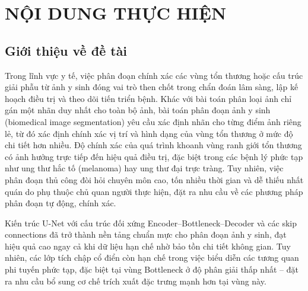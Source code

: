 \documentclass[14pt]{article}  %
\begin{document}
    \section{NỘI DUNG THỰC HIỆN}
    {


    \subsection{Giới thiệu về đề tài}

    Trong lĩnh vực y tế, việc phân đoạn chính xác các vùng tổn thương hoặc cấu trúc giải phẫu từ ảnh y sinh đóng vai trò then chốt trong chẩn đoán lâm sàng, lập kế hoạch điều trị và theo dõi tiến triển bệnh. Khác với bài toán phân loại ảnh chỉ gán một nhãn duy nhất cho toàn bộ ảnh, bài toán phân đoạn ảnh y sinh (biomedical image segmentation) yêu cầu xác định nhãn cho từng điểm ảnh riêng lẻ, từ đó xác định chính xác vị trí và hình dạng của vùng tổn thương ở mức độ chi tiết hơn nhiều. Độ chính xác của quá trình khoanh vùng ranh giới tổn thương có ảnh hưởng trực tiếp đến hiệu quả điều trị, đặc biệt trong các bệnh lý phức tạp như ung thư hắc tố (melanoma) hay ung thư đại trực tràng. Tuy nhiên, việc phân đoạn thủ công đòi hỏi chuyên môn cao, tốn nhiều thời gian và dễ thiếu nhất quán do phụ thuộc chủ quan người thực hiện, đặt ra nhu cầu về các phương pháp phân đoạn tự động, chính xác.

    Kiến trúc U-Net \cite{ronneberger2015unet} với cấu trúc đối xứng Encoder--Bottleneck--Decoder và các skip connections đã trở thành nền tảng chuẩn mực cho phân đoạn ảnh y sinh, đạt hiệu quả cao ngay cả khi dữ liệu hạn chế nhờ bảo tồn chi tiết không gian. Tuy nhiên, các lớp tích chập cổ điển còn hạn chế trong việc biểu diễn các tương quan phi tuyến phức tạp, đặc biệt tại vùng Bottleneck ở độ phân giải thấp nhất -- đặt ra nhu cầu bổ sung cơ chế trích xuất đặc trưng mạnh hơn tại vùng này.

}
\end{document}

